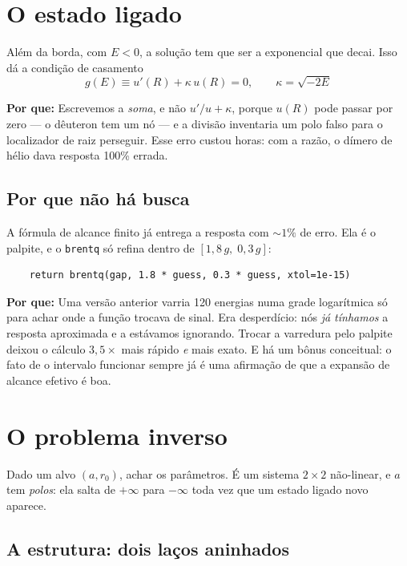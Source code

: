 \documentclass[11pt,a4paper]{article}
\newcommand{\pq}[1]{\medskip\noindent\textbf{Por que:} #1\medskip}
\begin{document}
\section{O estado ligado}

Além da borda, com $E<0$, a solução tem que ser a exponencial que decai. Isso dá
a condição de casamento
\begin{equation}
  \boxed{\;g(E) \equiv u'(R) + \kappa\,u(R) = 0,\qquad \kappa = \sqrt{-2E}\;}
\end{equation}

\pq{Escrevemos a \emph{soma}, e não $u'/u + \kappa$, porque $u(R)$ pode passar
por zero --- o dêuteron tem um nó --- e a divisão inventaria um polo falso para
o localizador de raiz perseguir. Esse erro custou horas: com a razão, o dímero
de hélio dava resposta 100\% errada.}

\subsection*{Por que não há busca}

A fórmula de alcance finito já entrega a resposta com $\sim1\%$ de erro. Ela é o
palpite, e o \texttt{brentq} só refina dentro de $[1{,}8\,g,\;0{,}3\,g]$:

\begin{lstlisting}
    return brentq(gap, 1.8 * guess, 0.3 * guess, xtol=1e-15)
\end{lstlisting}

\pq{Uma versão anterior varria 120 energias numa grade logarítmica só para achar
onde a função trocava de sinal. Era desperdício: nós \emph{já tínhamos} a
resposta aproximada e a estávamos ignorando. Trocar a varredura pelo palpite
deixou o cálculo $3{,}5\times$ mais rápido \emph{e} mais exato. E há um bônus
conceitual: o fato de o intervalo funcionar sempre já é uma afirmação de que a
expansão de alcance efetivo é boa.}

\section{O problema inverso}

Dado um alvo $(a, r_0)$, achar os parâmetros. É um sistema $2\times2$ não-linear,
e $a$ tem \emph{polos}: ela salta de $+\infty$ para $-\infty$ toda vez que um
estado ligado novo aparece.

\subsection{A estrutura: dois laços aninhados}
\end{document}
